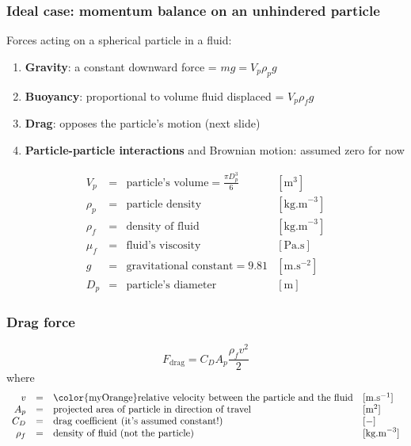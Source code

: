 \begin{frame}\frametitle{Ideal case: momentum balance on an unhindered particle}
	Forces acting on a spherical particle in a fluid:
	\begin{enumerate}
		\item	\textbf{Gravity}: a constant downward force = $mg = V_p \rho_p g$
		\item	\textbf{Buoyancy}: proportional to volume fluid displaced = $V_p \rho_f g$
		\item	\textbf{Drag}: opposes the particle's motion (next slide)
		\item	\textbf{Particle-particle interactions} and Brownian motion: assumed zero for now
	\end{enumerate}
	\[
		\begin{array}{rcll}
			V_p		&=& \text{particle's volume} = \displaystyle \frac{\pi D_p^3}{6} &[\text{m}^3]\\
			\rho_p 	&=& \text{particle density} &[\text{kg.m}^{-3}]\\
			\rho_f  &=& \text{density of fluid} &[\text{kg.m}^{-3}]\\
			\mu_f   &=& \text{fluid's viscosity} &[\text{Pa.s}]\\
			g		&=& \text{gravitational constant} = 9.81 &[\text{m.s}^{-2}] \\
			D_p 	&=& \text{particle's diameter} &[\text{m}]
		\end{array}
	\]
\end{frame}

\begin{frame}\frametitle{Drag force}
	\[
	 	F_\text{drag} = C_D A_p \frac{\rho_f v^2}{2}
	\]
	where
	\[
		\begin{array}{rcll}
			v	    &=& \text{{\color{myOrange}relative} velocity between the particle and the fluid} &[\text{m.s}^{-1}] \\
			A_p     &=& \text{projected area of particle in direction of travel} &[\text{m}^2] \\
			C_D	    &=& \text{drag coefficient (it's assumed constant!)} &[-] \\
			\rho_f  &=& \text{density of fluid (not the particle)}  &[\text{kg.m}^{-3}]
		\end{array}
	\]
\end{frame}

